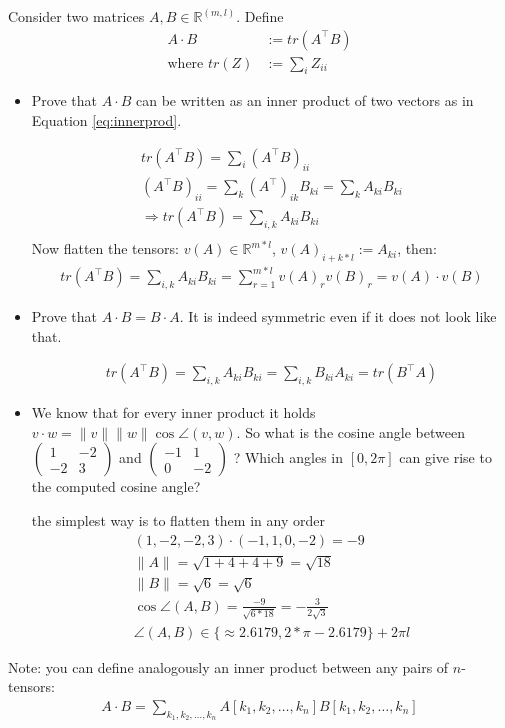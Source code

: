 \documentclass{article}
\newcommand{\eqn}[1]{\begin{align*}#1\end{align*}}%
\newcommand{\bi}[1]{\begin{itemize}#1\end{itemize}}
\newcommand{\RR}{\mathbb{R}}
\begin{document}
Consider two matrices $A,B \in \RR^{(m,l) }$. Define
\eqn{
A \cdot B &:= tr( A^\top B ) \label{eq:innerprod2} \\
\text{where } tr(Z) &:= \sum_i Z_{ii}
}

\bi{
\item Prove that $A \cdot B $ can be written as an inner product of two vectors as in Equation \eqref{eq:innerprod}.




\eqn{
tr( A^\top B )  = \sum_i ( A^\top B )_{ii} \\
 (A^\top B)_{ii} = \sum_k (A^\top)_{ik} B_{ki} = \sum_k A_{ki} B_{ki}\\
\Rightarrow tr( A^\top B )  = \sum_{i,k} A_{ki} B_{ki}\\
}
Now flatten the tensors:
$v(A) \in \RR^{m * l } $, $v(A)_{i+k*l} := A_{ki} $, then:
\eqn{
tr( A^\top B )  = \sum_{i,k} A_{ki} B_{ki} = \sum_{r=1}^{m*l} v(A)_r v(B)_r  = v(A) \cdot v(B)
}


\item Prove that $A \cdot B =  B \cdot A$. It is indeed symmetric even if it does not look like that.

\eqn{
tr( A^\top B )  =  \sum_{i,k} A_{ki} B_{ki} = \sum_{i,k} B_{ki} A_{ki} = tr( B^\top A )
}


\item We know that for every inner product it holds $v \cdot w = \|v\| \|w\| \cos \angle (v,w)  $. So what is the cosine angle between $ \begin{pmatrix} 1 & -2 \\ -2 & 3 \end{pmatrix}  $ and  $ \begin{pmatrix} -1 & 1 \\ 0 & -2 \end{pmatrix}  $ ? Which angles in $[0,2\pi]$ can give rise to the computed cosine angle?


the simplest way is to flatten them in any order
\eqn{
(1,-2,-2,3) \cdot (-1,1,0,-2) = -9\\
\|A\| = \sqrt{ 1+4+4+9 } = \sqrt{ 18 } \\
\|B\| = \sqrt{ 6 } = \sqrt{ 6 }\\
\cos \angle (A,B) =  \frac{-9}{ \sqrt{6*18} } = -\frac{3}{2 \sqrt{3}} \\
\angle (A,B) \in \{ \approx 2.6179, 2*\pi - 2.6179 \} + 2\pi l
}

}

Note: you can define analogously an inner product between any pairs of $n$-tensors:
\eqn{
A \cdot B = \sum_{k_1,k_2,\ldots,k_n} A[k_1,k_2,\ldots,k_n] B [k_1,k_2,\ldots,k_n]
}
\end{document}

